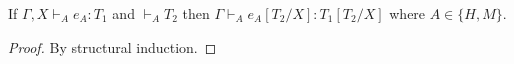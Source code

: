 \begin{lemma}
\label{tes}
\onehalfspacing
If $\Gamma,X\vdash_{A}e_{A}:T_{1}$ and $\vdash_{A}T_{2}$ then $\Gamma\vdash_{A}e_{A}[T_{2}/X]:T_{1}[T_{2}/X]$ where $A\in\lbrace H,M\rbrace$.
\begin{proof}
By structural induction.
\end{proof}
\end{lemma}